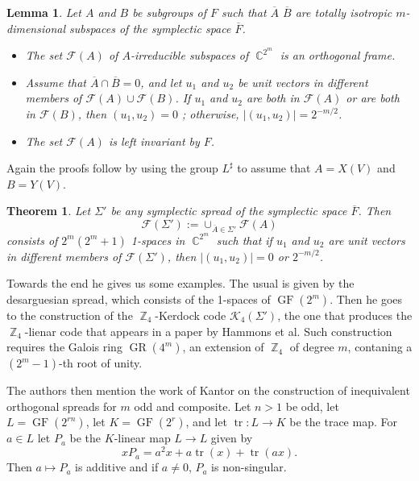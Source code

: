 \documentclass[a4paper]{article}
\DeclareMathOperator{\C}{\mathbb{C}}
\DeclareMathOperator{\Z}{\mathbb{Z}}
\DeclareMathOperator{\tr}{tr}
\DeclareMathOperator{\GF}{GF}
\DeclareMathOperator{\GR}{GR}
\newtheorem{theorem}{Theorem}
\newtheorem{lemma}{Lemma}
\begin{document}
  \begin{lemma}
    Let $A$ and $B$ be subgroups of $F$ such that
    $\overline{A}$ $\overline{B}$ are totally isotropic
    $m$-dimensional subspaces of the symplectic space
    $\overline{F}$.
    \begin{itemize}
      \item The set $\mathcal F(A)$ of $A$-irreducible
        subspaces of $\C^{2^{m}}$ is an orthogonal frame.
      \item Assume that $\overline{A} \cap \overline{B} =
        0$, and let $u_1$ and $u_2$ be unit vectors in
        different members of $\mathcal F(A) \cup \mathcal
        F(B)$. If $u_1$ and $u_2$ are both in $\mathcal
        F(A)$ or are both in $\mathcal F(B)$, then
        $(u_1,u_2) = 0$ ; otherwise, $|(u_1,u_2)| = 2^{-m /
        2}$.
      \item The set $\mathcal F(A)$ is left invariant by
        $F$.
    \end{itemize}
  \end{lemma}
  Again the proofs follow by using the group $L^{\sharp}$ to
  assume that $A = X(V)$ and $B = Y(V)$.

  \begin{theorem}
    Let $\Sigma'$ be any symplectic spread of the symplectic
    space $\overline{F}$. Then
    \[
      \mathcal F(\Sigma')
      := \cup_{\overline{A} \in \Sigma'}
      \mathcal F(A)
    \] 
    consists of $2^{m}(2^{m}+1)$ 1-spaces in $\C^{2^{m}}$ 
    such that if $u_1$ and $u_2$ are unit vectors in
    different members of $\mathcal F(\Sigma')$, then
    $|(u_1,u_2)| = 0$ or $2^{-m / 2}$.
  \end{theorem}

  Towards the end he gives us some examples. The usual is
  given by the desarguesian spread, which consists of the
  1-spaces of $\GF(2^{m})$. Then he goes to the construction
  of the $\Z_4$-Kerdock code $\mathcal K_4(\Sigma')$, the
  one that produces the $\Z_4$-lienar code that appears in a
  paper by Hammons et al. Such construction requires the
  Galois ring $\GR(4^{m})$, an extension of $\Z_4$ of degree
  $m$, contaning a $(2^{m}-1)$-th root of unity.

  The authors then mention the work of Kantor on the
  construction of inequivalent orthogonal spreads for $m$ 
  odd and composite. Let $n > 1$ be odd, let $L =
  \GF(2^{rn})$, let $K = \GF(2^{r})$, and let $\tr: L \to K$ 
  be the trace map. For $a \in L$ let $P_a$ be the
  $K$-linear map $L \to L$ given by
  \[
    xP_a = a^2 x + a \tr(x) + \tr(ax).
  \] 
  Then $a \mapsto P_a$ is additive and if $a \neq 0$, $P_a$ 
  is non-singular. 
\end{document}
